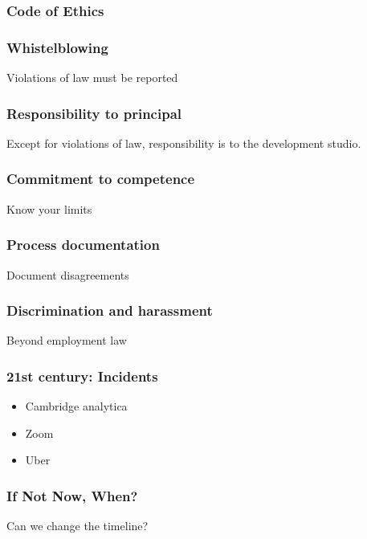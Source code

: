 \begin{frame}[fragile]
\frametitle{Code of Ethics}

\end{frame}


\begin{frame}[fragile]
\frametitle{Whistelblowing}

Violations of law must be reported

\end{frame}

\begin{frame}[fragile]
\frametitle{Responsibility to principal}

Except for violations of law,
responsibility is to the development studio.

\end{frame}

\begin{frame}[fragile]
\frametitle{Commitment to competence}

Know your limits

\end{frame}

\begin{frame}[fragile]
\frametitle{Process documentation}

Document disagreements

\end{frame}

\begin{frame}[fragile]
\frametitle{Discrimination and harassment}

Beyond employment law

\end{frame}

\begin{frame}[fragile]
\frametitle{21st century: Incidents}

\begin{itemize}
\item Cambridge analytica
\item Zoom
\item Uber
\end{itemize}

\end{frame}

\begin{frame}[fragile]
\frametitle{If Not Now, When?}

Can we change the timeline?

\end{frame}


